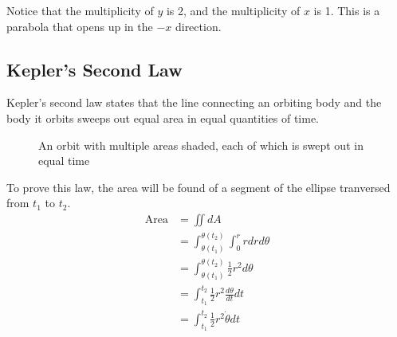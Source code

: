 \documentclass{article}
\begin{document}
Notice that the multiplicity of $y$ is 2, and the multiplicity of $x$ is 1. This is a parabola that opens up in the $-x$ direction.

\bigskip\bigskip
\subsection{Kepler's Second Law}\label{sec:Kepler's Second Law}

Kepler's second law states that the line connecting an orbiting body and the body it orbits sweeps out equal area in equal quantities of time.
\begin{figure}[H]
    \centering

    \caption{An orbit with multiple areas shaded, each of which is swept out in equal time}
\end{figure}

To prove this law, the area will be found of a segment of the ellipse tranversed from $t_1$ to $t_2$.
\begin{align*}
    \text{Area} & =\iint{}dA                                               \\
                & = \int_{\theta(t_1)}^{\theta(t_2)}\int_{0}^{r}rdrd\theta \\
                & = \int_{\theta(t_1)}^{\theta(t_2)}\frac{1}{2}r^2d\theta  \\
                & = \int_{t_1}^{t_2}\frac{1}{2}r^2\frac{d\theta}{dt}dt     \\
                & = \int_{t_1}^{t_2}\frac{1}{2}r^2\dot{\theta}dt           \\
\end{align*}
\end{document}
